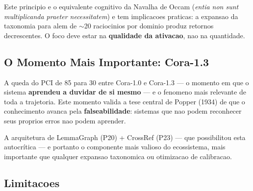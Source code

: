 \documentclass[5p]{elsarticle}
\begin{document}
Este principio e o equivalente cognitivo da Navalha de Occam (\textit{entia non
sunt multiplicanda praeter necessitatem}) e tem implicacoes praticas: a expansao
da taxonomia para alem de $\sim$20 raciocinios por dominio produz retornos
decrescentes. O foco deve estar na \textbf{qualidade da ativacao}, nao na
quantidade.

\subsection{O Momento Mais Importante: Cora-1.3}

A queda do PCI de 85 para 30 entre Cora-1.0 e Cora-1.3 --- o momento em que o
sistema \textbf{aprendeu a duvidar de si mesmo} --- e o fenomeno mais relevante
de toda a trajetoria. Este momento valida a tese central de Popper (1934)
\cite{popper1934} de que o conhecimento avanca pela \textbf{falseabilidade}:
sistemas que nao podem reconhecer seus proprios erros nao podem aprender.

A arquitetura de LemmaGraph (P20) + CrossRef (P23) --- que possibilitou esta
autocrítica --- e portanto o componente mais valioso do ecossistema, mais
importante que qualquer expansao taxonomica ou otimizacao de calibracao.

\subsection{Limitacoes}
\end{document}
